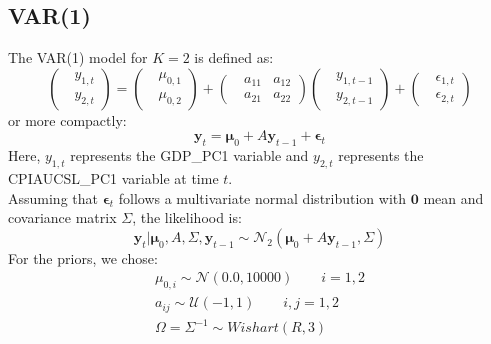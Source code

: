 \subsection*{VAR(1)}
The VAR(1) model for $K = 2$ is defined as:
\begin{equation}
    \label{eq:VAR1}
    \begin{pmatrix}
        \ \ \ y_{1,t} \\
        \ \ \ y_{2,t}
    \end{pmatrix}
    =
    \begin{pmatrix}
        \ \ \ \mu_{0,1} \\
        \ \ \ \mu_{0,2}
    \end{pmatrix}
    +
    \begin{pmatrix}
        \ \ \ a_{11} & a_{12} \\
        \ \ \ a_{21} & a_{22}
    \end{pmatrix}
    \begin{pmatrix}
        \ \ \ y_{1, t-1} \\
        \ \ \ y_{2, t-1}
    \end{pmatrix}
    +
    \begin{pmatrix}
        \ \ \ \epsilon_{1,t} \\
        \ \ \ \epsilon_{2,t}
    \end{pmatrix}
\end{equation}
or more compactly:
\begin{equation}
    \label{eq:VAR1_compact}
    \mathbf{y}_t = \bm{\mu}_0 + A \mathbf{y}_{t-1} + \bm{\epsilon}_t
\end{equation}
Here, \(y_{1,t}\) represents the GDP\_PC1 variable and \(y_{2,t}\) represents the CPIAUCSL\_PC1 variable at time $t$. \\
Assuming that $\bm{\epsilon}_t$ follows a multivariate normal distribution with $\bm{0}$ mean and covariance matrix $\Sigma$, the likelihood is:
\begin{equation}
    \label{eq:VAR1_likelihood}
    \mathbf{y}_{t}|\bm{\mu}_{0}, A, \Sigma, \mathbf{y}_{t-1} \sim \mathcal{N}_2(\bm{\mu}_{0} + A \mathbf{y}_{t-1}, \Sigma)
\end{equation}
For the priors, we chose:
\begin{equation}
    \label{eq:VAR1_priors}
    \begin{split}
        \mu_{0,i} \sim \mathcal{N}(0.0, 10000) \quad \quad i = 1, 2\\
        a_{ij} \sim \mathcal{U}(-1, 1) \quad \quad i,j = 1, 2 \\
        \Omega = \Sigma^{-1} \sim Wishart(R, 3)
    \end{split}
\end{equation}
